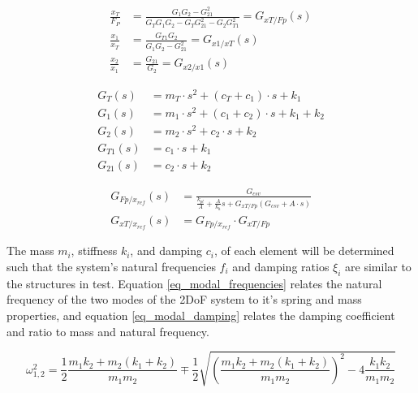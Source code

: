 \documentclass[9pt]{extarticle}
\begin{document}
\begin{minipage}{0.49\textwidth}

\begin{align}
    \frac{x_T}{F_P} &= \frac{G_1 G_2 - G_{21}^2}{G_T G_1 G_2 - G_T G_{21}^2 - G_2 G_{T1}^2} = G_{xT/Fp}(s) \label{G_xT_Fp}\\
    \frac{x_1}{x_T} &= \frac{G_{T1} G_2}{G_1 G_2 - G_{21}^2} = G_{x1/xT}(s) \\
    \frac{x_2}{x_1} &= \frac{G_{21}}{G_2} = G_{x2/x1}(s)
\end{align}
\end{minipage}
\hfill
\begin{minipage}{0.49\textwidth}
\begin{align}
    G_T(s) &= m_T\cdot s^2 + (c_T + c_1)\cdot s + k_1 \\
    G_1(s) &= m_1\cdot s^2 + (c_1 + c_2)\cdot s + k_1 + k_2 \\
    G_2(s) &= m_2\cdot s^2 + c_2\cdot s + k_2 \\
    G_{T1}(s) &= c_1\cdot s + k_1 \\
    G_{21}(s) &= c_2\cdot s + k_2 
\end{align}
\end{minipage}


\begin{align}
    G_{Fp/x_{ref}}(s) &= \frac{G_{csv}}{\frac{k_{pl}}{A} + \frac{A}{k_h} s + G_{xT/Fp} (G_{csv} + A\cdot s)} \\
    G_{xT/x_{ref}}(s) &= G_{Fp/x_{ref}} \cdot G_{xT/Fp} 
\end{align}

The mass $m_i$, stiffness $k_i$, and damping $c_i$, of each element will be determined such that the system's natural frequencies $f_i$ and damping ratios $\xi_i$ are similar to the structures in test. Equation \ref{eq_modal_frequencies} relates the natural frequency of the two modes of the 2DoF system to it's spring and mass properties, and equation \ref{eq_modal_damping} relates the damping coefficient and ratio to mass and natural frequency.

\begin{equation}\label{eq_modal_frequencies}
\omega_{1,2}^{2} = \frac{1}{2}\frac{m_1 k_2 + m_2 (k_1 + k_2)}{m_1 m_2} \mp \frac{1}{2} \sqrt{\left( \frac{m_1 k_2 + m_2 (k_1 + k_2)}{m_1 m_2} \right)^2 - 4 \frac{k_1 k_2}{m_1 m_2}} 
\end{equation}
\end{document}
